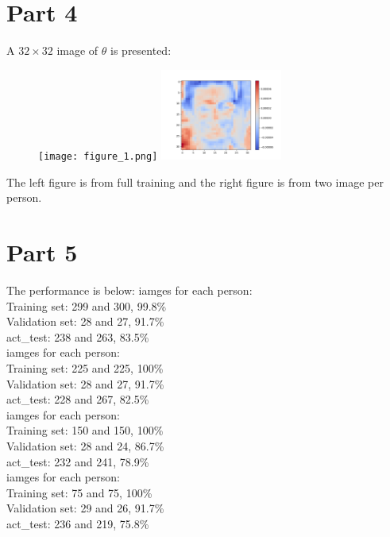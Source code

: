 \documentclass{article}
\begin{document}
\section{Part 4}
A $32\times32$ image of $\theta$ is presented:
\begin{figure}[ht!]
  \texttt{[image: figure\_1.png]}
 \hfill
  \includegraphics[width=40mm]{figure_2.png}
\end{figure}

The left figure is from full training and the right figure is from two image per person.

\section{Part 5}
The performance is below:
 iamges for each person:
\\Training set: 299 and 300, 99.8\%
\\Validation set: 28 and 27, 91.7\%
\\act\_test: 238 and 263, 83.5\%
\\
 iamges for each person: 
\\Training set: 225 and 225, 100\%
\\Validation set: 28 and 27, 91.7\%
\\act\_test: 228 and 267, 82.5\%
\\
 iamges for each person: 
\\Training set: 150 and 150, 100\%
\\Validation set: 28 and 24, 86.7\%
\\act\_test: 232 and 241, 78.9\%
\\
 iamges for each person: 
\\Training set: 75 and 75, 100\%
\\Validation set: 29 and 26, 91.7\%
\\act\_test: 236 and 219, 75.8\%
\\

\end{document}
